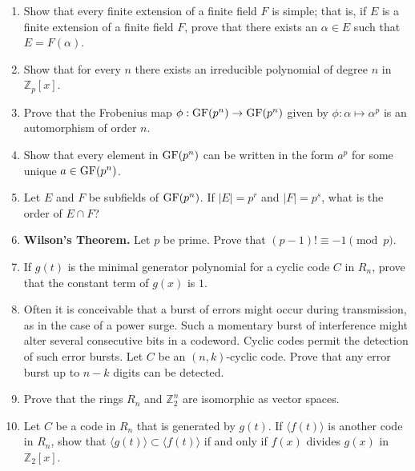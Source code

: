 {\begin{enumerate}
\item
Show that every finite extension of a finite field $F$ is simple;
that is, if $E$ is a finite extension of a finite field $F$, prove
that there exists an $\alpha \in E$ such that $E = F( \alpha )$.


\item
Show that for every $n$ there exists an irreducible polynomial of 
degree $n$ in~${\mathbb Z}_p[x]$.



\item
Prove that the {\bfi Frobenius map} $\phi : {\rm
GF}(p^n) \rightarrow {\rm GF}(p^n)$ given by $\phi : \alpha \mapsto
\alpha^p$ is an automorphism of order $n$. 


\item
Show that every element in ${\rm GF}(p^n)$ can be written in the form
$a^p$ for some unique $a \in {\rm GF}(p^n)$.


\item
Let $E$ and $F$ be subfields of ${\rm GF}(p^n)$. If $|E| = p^r$ and
$|F| = p^s$, what is the order of $E \cap F$? 


\item
{\bf Wilson's Theorem.}
Let $p$ be prime.  Prove that $(p-1)! \equiv -1 \pmod{p}$. 


\item
If $g(t)$ is the minimal generator polynomial for a cyclic code $C$ in
$R_n$, prove that the constant term of $g(x)$ is $1$.


\item
Often it is conceivable that a burst of errors might occur during
transmission, as in the case of a power surge.  Such a momentary burst
of interference might alter several consecutive bits in a codeword.
Cyclic codes permit the detection of such error bursts. Let $C$ be an
$(n,k)$-cyclic code. Prove that any error burst up to $n-k$ digits can
be detected.  


\item
Prove that the rings $R_n$ and ${\mathbb Z}_2^n$ are isomorphic as vector
spaces. 


\item
Let $C$ be a code in $R_n$ that is generated by $g(t)$. If $\langle
f(t) \rangle$ is another code in $R_n$, show that $\langle g(t) \rangle
\subset \langle f(t) \rangle$ if and only if $f(x)$ divides $g(x)$ in
${\mathbb Z}_2[x]$.



\end{enumerate}}
